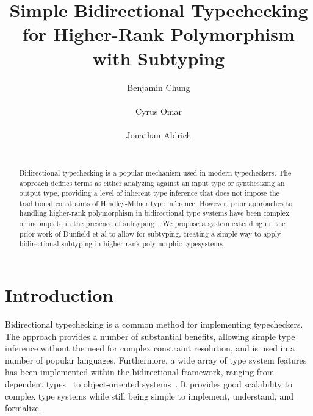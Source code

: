 \documentclass{sig-alternate}
\begin{document}
\title{Simple Bidirectional Typechecking for Higher-Rank Polymorphism with Subtyping}
\author{
	\alignauthor
	Benjamin Chung\\
	\\
	\alignauthor
	Cyrus Omar\\
	\\
	\alignauthor
	Jonathan Aldrich\\
	\\
}

\maketitle

\begin{abstract}
Bidirectional typechecking is a popular mechanism used in modern typecheckers. The approach defines terms as either analyzing against an input type or synthesizing an output type, providing a level of inherent type inference that does not impose the traditional constraints of Hindley-Milner type inference. However, prior approaches to handling higher-rank polymorphism in bidirectional type systems have been complex~\cite{Pierce:2000:LTI:345099.345100} or incomplete in the presence of subtyping~\cite{Dunfield:2013:CEB:2544174.2500582}. We propose a system extending on the prior work of Dunfield et al to allow for subtyping, creating a simple way to apply bidirectional subtyping in higher rank polymorphic typesystems.
\end{abstract}

\section{Introduction}
Bidirectional typechecking is a common method for implementing typecheckers. The approach provides a number of substantial benefits, allowing simple type inference without the need for complex constraint resolution, and is used in a number of popular languages. Furthermore, a wide array of type system features has been implemented within the bidirectional framework, ranging from dependent types~\cite{Coquand96analgorithm} to object-oriented systems~\cite{odersky2001colored}. It provides good scalability to complex type systems while still being simple to implement, understand, and formalize.
\end{document}
